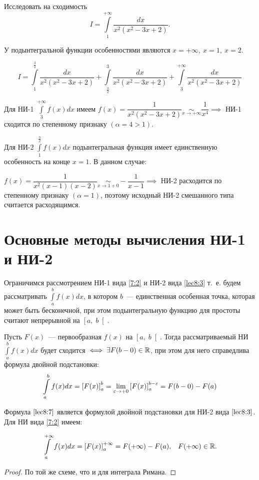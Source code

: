 \documentclass[../../main.tex]{subfiles}
\begin{document}
\begin{exmp} Исследовать на сходимость
\[I = \int\limits_{1}^{+\infty}\dfrac{dx}{x^2(x^2 - 3x + 2)}.\]

У подынтегральной функции особенностями являются $x = +\infty,\ x = 1,\ x = 
2$.

\[I = \int\limits_{1}^{\frac{3}{2}}\dfrac{dx}{x^2(x^2 - 3x +2 )} + 
\int\limits_{\frac{3}{2}}^{3}\dfrac{dx}{x^2(x^2 - 3x +2 )} + 
\int\limits_{3}^{+\infty}\dfrac{dx}{x^2(x^2 - 3x +2 )}\]

Для НИ-1 $\displaystyle\int\limits_{3}^{+\infty}f(x)dx$ имеем $f(x) = 
\dfrac{1}{x^2(x^2 -3x + 2)} \underset{x \to +\infty} \sim \dfrac{1}{x^4} 
\implies$ НИ-1 сходится по степенному признаку $\left(\alpha = 4 > 1\right)$.

Для НИ-2 $\displaystyle\int\limits_{1}^{\frac{3}{2}}f(x)dx$ подынтегральная 
функция имеет единственную особенность на конце $x = 1$. В данном случае:

$f(x) = \dfrac{1}{x^2(x-1)(x-2)} \underset{x \to 1 + 0}\sim -\dfrac{1}{x - 1} 
\implies$ НИ-2 расходится по степенному признаку $\left(\alpha = 1\right)$, 
поэтому исходный НИ-2 смешанного типа считается расходящимся. 
\end{exmp}

\section{Основные методы вычисления НИ-1 и НИ-2}
\label{lec8:methods}

Ограничимся рассмотрением НИ-1 вида \eqref{7:2} и НИ-2 вида \eqref{lec8:3}
т.~е. будем 
рассматривать $\displaystyle\int\limits_{a}^{b}f(x)dx$, в котором $b$~--- 
единственная особенная точка, которая может быть бесконечной, при этом 
подынтегральную функцию для простоты считают непрерывной на $\left[a,\; 
b\right[$. 

\begin{thm}
Пусть $F(x)$~--- первообразная $f(x)$ на $\left[a,\; b\right[$. Тогда 
рассматриваемый НИ $\displaystyle\int\limits_{a}^{b}f(x)dx$ будет сходится 
$\iff \exists F(b-0)\in \mathbb{R}$, при этом для него справедлива формула двойной 
подстановки:
\begin{equation}\label{lec8:7}
\int\limits_{a}^{b}f(x)dx = \left[F(x)\right]_{a}^{b} = \underset{\varepsilon \to 
+0}\lim\left[F(x)\right]_{a}^{b - \varepsilon} = F(b - 0) - F(a) 
\end{equation}

Формула $\eqref{lec8:7}$ является формулой двойной подстановки для НИ-2 вида 
$\eqref{lec8:3}$. Для НИ вида \eqref{7:2} имеем:

\begin{equation}\label{lec8:8}
\int\limits_{a}^{+\infty}f(x)dx = \left[F(x)\right]_{a}^{+\infty} = F(+\infty) 
- F(a), \;\;\; F(+\infty) \in \mathbb{R}.
\end{equation}
\end{thm}

\begin{proof}
По той же схеме, что и для интеграла Римана.
\end{proof}
\end{document}
